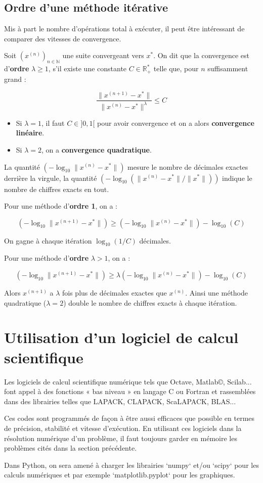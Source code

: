 \subsection{ Ordre d’une méthode itérative}

Mis à part le nombre d’opérations total à exécuter, il peut être intéressant de comparer des vitesses de convergence.

Soit $(x^{(n)})_{n \in \mathbb{N}}$ une suite convergeant vers $x^*$. On dit que la convergence est d’\textbf{ordre} $\lambda \geq 1$, s’il existe une constante $C \in \mathbb{R}^*_+$ telle que, pour $n$ suffisamment grand :

$$
\frac{\|x^{(n+1)} - x^*\|}{\|x^{(n)} - x^*\|^\lambda} \leq C
$$

\begin{itemize}
\item Si $\lambda = 1$, il faut $C \in ]0, 1[$ pour avoir convergence et on a alors \textbf{convergence linéaire}.
\item Si $\lambda = 2$, on a \textbf{convergence quadratique}.
\end{itemize}

La quantité $(-\log_{10} \|x^{(n)} - x^*\|)$ mesure le nombre de décimales exactes derrière la virgule, la quantité $(-\log_{10} (\|x^{(n)} - x^*\| / \|x^*\|))$ indique le nombre de chiffres exacts en tout.

Pour une méthode d’\textbf{ordre 1}, on a :

$$
(-\log_{10} \|x^{(n+1)} - x^*\|) \geq (-\log_{10} \|x^{(n)} - x^*\|) - \log_{10}(C)
$$

On gagne à chaque itération $\log_{10}(1/C)$ décimales.

Pour une méthode d’\textbf{ordre} $\lambda > 1$, on a :

$$
(-\log_{10} \|x^{(n+1)} - x^*\|) \geq \lambda (-\log_{10} \|x^{(n)} - x^*\|) - \log_{10}(C)
$$

Alors $x^{(n+1)}$ a $\lambda$ fois plus de décimales exactes que $x^{(n)}$. Ainsi une méthode quadratique ($\lambda = 2$) double le nombre de chiffres exacts à chaque itération.

\section{ Utilisation d’un logiciel de calcul scientifique}

Les logiciels de calcul scientifique numérique tels que Octave, Matlab©, Scilab... font appel à des fonctions « bas niveau » en langage C ou Fortran et rassemblées dans des librairies telles que LAPACK, CLAPACK, ScaLAPACK, BLAS...

Ces codes sont programmés de façon à être aussi efficaces que possible en termes de précision, stabilité et vitesse d’exécution. En utilisant ces logiciels dans la résolution numérique d’un problème, il faut toujours garder en mémoire les problèmes cités dans la section précédente.

Dans Python, on sera amené à charger les librairies `numpy` et/ou `scipy` pour les calculs numériques et par exemple `matplotlib.pyplot` pour les graphiques.